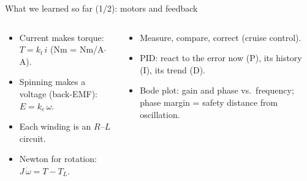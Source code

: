 \documentclass[aspectratio=169,10pt]{beamer}
\begin{document}
\begin{frame}[t]{What we learned so far (1/2): motors and feedback}
\begin{columns}[T,onlytextwidth]
\begin{defbox}
\begin{itemize}\small
\item Current makes torque: $T=k_t\,i$ (\si{Nm} = \si{Nm/A}$\cdot$\si{A}).
\item Spinning makes a voltage (back-EMF): $E=k_e\,\omega$.
\item Each winding is an $R$--$L$ circuit.
\item Newton for rotation: $J\,\dot\omega=T-T_L$.
\end{itemize}
\end{defbox}
\begin{defbox}
\begin{itemize}\small
\item Measure, compare, correct (cruise control).
\item PID: react to the error now (P), its history (I), its trend (D).
\item Bode plot: gain and phase vs.\ frequency; phase margin = safety distance from oscillation.
\end{itemize}
\end{defbox}
\centering
{}
\end{columns}
\end{frame}
\end{document}
